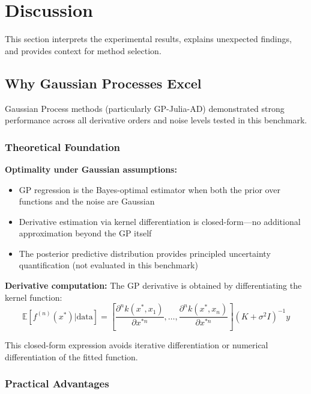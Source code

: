 \section{Discussion}
\label{sec:discussion}

This section interprets the experimental results, explains unexpected findings, and provides context for method selection.

\subsection{Why Gaussian Processes Excel}
\label{sec:gp_excellence}

Gaussian Process methods (particularly GP-Julia-AD) demonstrated strong performance across all derivative orders and noise levels tested in this benchmark.

\subsubsection{Theoretical Foundation}

\textbf{Optimality under Gaussian assumptions:}
\begin{itemize}
    \item GP regression is the Bayes-optimal estimator when both the prior over functions and the noise are Gaussian
    \item Derivative estimation via kernel differentiation is closed-form---no additional approximation beyond the GP itself
    \item The posterior predictive distribution provides principled uncertainty quantification (not evaluated in this benchmark)
\end{itemize}

\textbf{Derivative computation:}
The GP derivative is obtained by differentiating the kernel function:
\begin{equation}
\mathbb{E}[f^{(n)}(x^*) | \text{data}] = \left[\frac{\partial^n k(x^*, x_1)}{\partial x^{*n}}, \ldots, \frac{\partial^n k(x^*, x_n)}{\partial x^{*n}}\right] (K + \sigma^2I)^{-1} y
\end{equation}

This closed-form expression avoids iterative differentiation or numerical differentiation of the fitted function.

\subsubsection{Practical Advantages}

